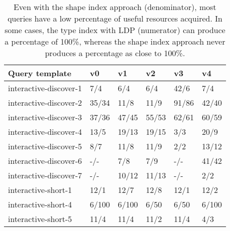 \begin{table}
	\begin{center}
		\begin{tabular}{|l|l|l|l|l|l|}
			\hline
			Query template & v0 & v1 & v2 & v3 & v4 \\
			\hline
			interactive-discover-1 & 7/4 & 6/4 & 6/4 & 42/6 & 7/4 \\
			\hline
			interactive-discover-2 & 35/34 & 11/8 & 11/9 & 91/86 & 42/40 \\
			\hline
			interactive-discover-3 & 37/36 & 47/45 & 55/53 & 62/61 & 60/59 \\
			\hline
			interactive-discover-4 & 13/5 & 19/13 & 19/15 & 3/3 & 20/9 \\
			\hline
			interactive-discover-5 & 8/7 & 11/8 & 11/9 & 2/2 & 13/12 \\
			\hline
			interactive-discover-6 & -/- & 7/8 & 7/9 & -/- & 41/42 \\
			\hline
			interactive-discover-7 & -/- & 10/12 & 11/13 & -/- & 2/2 \\
			\hline
			interactive-short-1 & 12/1 & 12/7 & 12/8 & 12/1 & 12/2 \\
			\hline
			interactive-short-4 & 6/100 & 6/100 & 6/50 & 6/50 & 6/100 \\
			\hline
			interactive-short-5 & 11/4 & 11/4 & 11/2 & 11/4 & 4/3 \\
			\hline
		\end{tabular}
	\end{center}
	\caption{Even with the shape index approach (denominator), most queries have a low percentage of useful resources acquired. In some cases, the type index with LDP (numerator) can produce a percentage of 100\%, whereas the shape index approach never produces a percentage as close to 100\%.}
	\label{tab:ratioUsefulResources}
\end{table}
